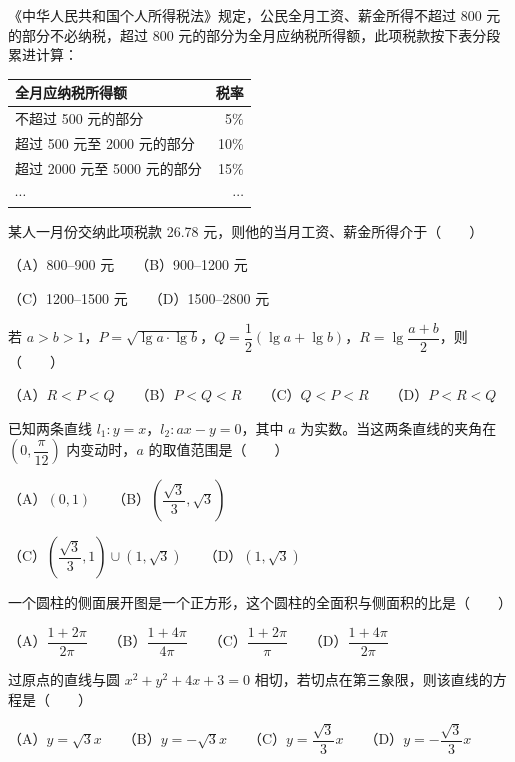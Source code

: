 \begin{question}
《中华人民共和国个人所得税法》规定，公民全月工资、薪金所得不超过 800 元的部分不必纳税，超过 800 元的部分为全月应纳税所得额，此项税款按下表分段累进计算：

\begin{center}
\begin{tabular}{lr}
\toprule
全月应纳税所得额 & 税率 \\
\midrule
不超过 500 元的部分 & 5\% \\
超过 500 元至 2000 元的部分 & 10\% \\
超过 2000 元至 5000 元的部分 & 15\% \\
$\cdots$ & $\cdots$ \\
\bottomrule
\end{tabular}
\end{center}

某人一月份交纳此项税款 26.78 元，则他的当月工资、薪金所得介于\mbox{（　　）}

（A）800–900 元　　（B）900–1200 元

（C）1200–1500 元　　（D）1500–2800 元

\end{question}
\begin{question}
若 $a>b>1$，$P=\sqrt{\lg a\cdot\lg b}$，$Q=\dfrac12(\lg a+\lg b)$，$R=\lg\dfrac{a+b}{2}$，则\mbox{（　　）}

（A）$R<P<Q$　　（B）$P<Q<R$　　（C）$Q<P<R$　　（D）$P<R<Q$

\end{question}
\begin{question}
已知两条直线 $l_1:y=x$，$l_2:ax-y=0$，其中 $a$ 为实数。当这两条直线的夹角在 $\left(0,\dfrac\pi{12}\right)$ 内变动时，$a$ 的取值范围是\mbox{（　　）}

（A）$\left(0,1\right)$　　（B）$\left(\dfrac{\sqrt3}{3},\sqrt3\right)$

（C）$\left(\dfrac{\sqrt3}{3},1\right)\cup\left(1,\sqrt3\right)$　　（D）$\left(1,\sqrt3\right)$

\end{question}
\begin{question}
一个圆柱的侧面展开图是一个正方形，这个圆柱的全面积与侧面积的比是\mbox{（　　）}

（A）$\dfrac{1+2\pi}{2\pi}$　　（B）$\dfrac{1+4\pi}{4\pi}$　　（C）$\dfrac{1+2\pi}{\pi}$　　（D）$\dfrac{1+4\pi}{2\pi}$

\end{question}
\begin{question}
过原点的直线与圆 $x^2+y^2+4x+3=0$ 相切，若切点在第三象限，则该直线的方程是\mbox{（　　）}

（A）$y=\sqrt3x$　　（B）$y=-\sqrt3x$　　（C）$y=\dfrac{\sqrt3}{3}x$　　（D）$y=-\dfrac{\sqrt3}{3}x$

\end{question}
